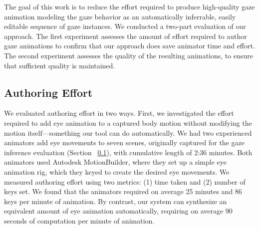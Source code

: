 The goal of this work is to reduce the effort required to produce high-quality gaze animation modeling the gaze behavior as an automatically inferrable, easily editable sequence of gaze instances. %
We conducted a two-part evaluation of our approach. The first experiment assesses the amount of effort required to author gaze animations to confirm that our approach does save animator time and effort. The second experiment assesses the quality of the resulting animations, to ensure that sufficient quality is maintained.

\subsection{Authoring Effort}
\label{sec:GazeAuthoringEffortEvaluation}

We evaluated authoring effort in two ways. First, we investigated the effort required to add eye animation to a captured body motion without modifying the motion itself---something our tool can do automatically. We had two experienced animators add eye movements to seven scenes, originally captured for the gaze inference evaluation (Section ~\ref{sec:GazeAuthoringEffortEvaluation}), with cumulative length of 2:36 minutes. Both animators used Autodesk MotionBuilder, where they set up a simple eye animation rig, which they keyed to create the desired eye movements. We measured authoring effort using two metrics: (1) time taken and (2) number of keys set. We found that the animators required on average 25 minutes and 86 keys per minute of animation. By contrast, our system can synthesize an equivalent amount of eye animation automatically, requiring on average 90 seconds of computation per minute of animation.

